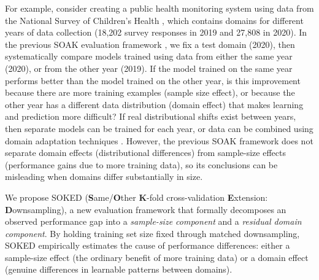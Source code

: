 \documentclass[twoside]{article}
\begin{document}
For example, consider creating a public health monitoring system using data from the National Survey of Children’s Health \citep{NSCH2019}, which contains domains for different years of data collection (18,202 survey responses in 2019 and 27,808 in 2020).
In the previous SOAK evaluation framework \citep{hocking2026}, we fix a test domain (2020), then systematically compare models trained using data from either the same year (2020), or from the other year (2019).
If the model trained on the same year performs better than the model trained on the other year, is this improvement because there are more training examples (sample size effect), or because the other year has a different data distribution (domain effect) that makes learning and prediction more difficult?
If real distributional shifts exist between years, then separate models can be trained for each year, or data can be combined using domain adaptation techniques \citep{CostaJussa2015}.
However, the previous SOAK framework does not separate domain effects (distributional differences) from sample-size effects (performance gains due to more training data), so its conclusions can be misleading when domains differ substantially in size.

We propose SOKED (\textbf{S}ame/\textbf{O}ther \textbf{K}-fold cross-validation \textbf{E}xtension: \textbf{D}ownsampling), a new evaluation framework that formally decomposes an observed performance gap into a \emph{sample-size component} and a \emph{residual domain component}.
By holding training set size fixed through matched downsampling, SOKED empirically estimates the cause of performance differences: either a sample-size effect (the ordinary benefit of more training data) or a domain effect (genuine differences in learnable patterns between domains).

\end{document}
